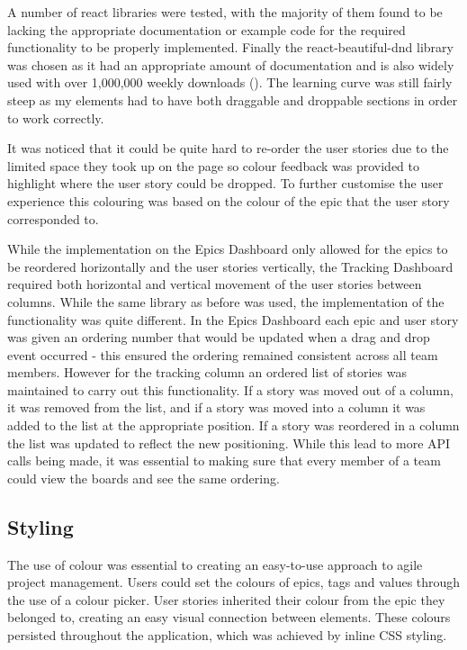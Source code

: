 \documentclass[l4proj.tex]{subfiles}
\begin{document}
A number of react libraries were tested, with the majority of them found to be lacking the appropriate documentation or example code for the required functionality to be properly implemented. Finally the react-beautiful-dnd library was chosen as it had an appropriate amount of documentation and is also widely used with over 1,000,000 weekly downloads (\cite{ReactDnD}). The learning curve was still fairly steep as my elements had to have both draggable and droppable sections in order to work correctly. 

It was noticed that it could be quite hard to re-order the user stories due to the limited space they took up on the page so colour feedback was provided to highlight where the user story could be dropped. To further customise the user experience this colouring was based on the colour of the epic that the user story corresponded to. 

While the implementation on the Epics Dashboard only allowed for the epics to be reordered horizontally and the user stories vertically, the Tracking Dashboard required both horizontal and vertical movement of the user stories between columns. While the same library as before was used, the implementation of the functionality was quite different. In the Epics Dashboard each epic and user story was given an ordering number that would be updated when a drag and drop event occurred - this ensured the ordering remained consistent across all team members. However for the tracking column an ordered list of stories was maintained to carry out this functionality. If a story was moved out of a column, it was removed from the list, and if a story was moved into a column it was added to the list at the appropriate position. If a story was reordered in a column the list was updated to reflect the new positioning. While this lead to more API calls being made, it was essential to making sure that every member of a team could view the boards and see the same ordering. 

\subsection{Styling}
The use of colour was essential to creating an easy-to-use approach to agile project management. Users could set the colours of epics, tags and values through the use of a colour picker. User stories inherited their colour from the epic they belonged to, creating an easy visual connection between elements. These colours persisted throughout the application, which was achieved by inline CSS styling. 
\end{document}
